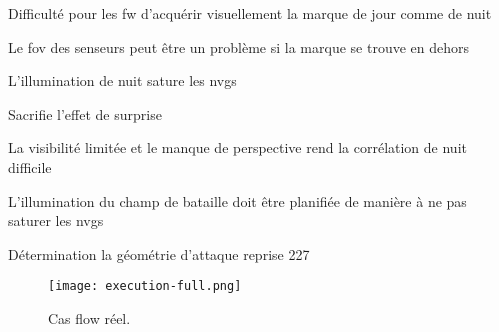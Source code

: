 \begin{e1}
\begin{e2}
\begin{e3}
\begin{e4}
\begin{e5}
\begin{e6}
						\item Difficulté pour les \gls{fw} d'acquérir visuellement la marque de jour comme de nuit
						\item Le \gls{fov} des senseurs peut être un problème si la marque se trouve en dehors
						\item L'illumination de nuit sature les \glspl{nvg}
						\item Sacrifie l'effet de surprise
					\end{e6}
				\end{e5}
				\begin{e5}
					\item La visibilité limitée et le manque de perspective rend la corrélation de nuit difficile
					\item L'illumination du champ de bataille doit être planifiée de manière à ne pas saturer les \glspl{nvg}
				\end{e5}
			\end{e4}
	   	\end{e3}
	\end{e2}
	\item Détermination la géométrie d'attaque reprise 227 %
\end{e1}
	\begin{figure}[H]
		\texttt{[image: execution-full.png]}
		\caption{Cas flow réel.}
		\label{fig:casflow-full}
	\end{figure}
